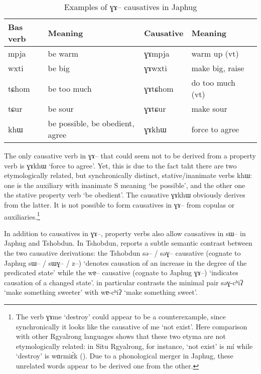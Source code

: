 \documentclass[oldfontcommands,oneside,a4paper,11pt]{article}
\newcommand{\ipa}[1]{{\phon \mbox{#1}}} %
\begin{document}
\begin{table}[h]
\caption{Examples of \ipa{ɣɤ--} causatives in Japhug} \label{tab:GA.caus} \centering
\begin{tabular}{lllll}
\toprule
Bas verb & Meaning & Causative & Meaning\\
\midrule
\ipa{mpja} & be warm & \ipa{ɣɤmpja} & warm up (vt)\\
\ipa{wxti} & be big & \ipa{ɣɤwxti} & make big, raise\\
\ipa{tɕhom} & be too much & \ipa{ɣɤtɕhom} & do too much (vt)\\
\ipa{tɕur} 	& be sour & \ipa{ɣɤtɕur} & make sour\\
\midrule
\ipa{khɯ} 	& be possible, be obedient, agree & \ipa{ɣɤkhɯ} & force to agree\\
\bottomrule
\end{tabular}
\end{table}
The only causative verb in \ipa{ɣɤ--} that could seem not to be derived from a property verb is \ipa{ɣɤkhɯ} `force to agree'. Yet, this is due to the fact taht there are two etymologically related, but synchronically distinct,  stative/inanimate verbs \ipa{khɯ}: one is the auxiliary with inanimate S meaning `be possible', and the other one the stative property verb `be obedient'. The causative \ipa{ɣɤkhɯ} obviously derives from the latter. It is not possible to form causatives in \ipa{ɣɤ--} from copulas or auxiliaries.\footnote{The verb \ipa{ɣɤme} `destroy' could appear to be a counterexample, since synchronically it looks like the causative of \ipa{me} `not exist'. Here comparison with other Rgyalrong languages shows that these two etyma are not etymologically related: in Situ Rgyalrong, for instance, `not exist' is \ipa{mí}  while `destroy' is \ipa{wɑrmiɛ́k}  (\citealt[334, 343]{huangsun02}). Due to a phonological merger in Japhug, these unrelated words appear to be derived one from the other. }

In addition to causatives in \ipa{ɣɤ--}, property verbs also allow causatives in \ipa{sɯ--} in Japhug and Tshobdun. In Tshobdun, \citet{jackson06paisheng, jackson13morpho} reports a subtle semantic contrast between the two causative derivations: the Tshobdun \ipa{sə--} / \ipa{səɣ--} causative (cognate to Japhug \ipa{sɯ--} / \ipa{sɯɣ--} / \ipa{z--}) `denotes causation of an increase in the degree
of the predicated state'  while the \ipa{wɐ--} causative (cognate to Japhug \ipa{ɣɤ--}) `indicates causation of a changed state'. \citet{jackson13morpho} in particular contrasts the minimal pair \ipa{səɣ-cʰiʔ} `make something sweeter' with \ipa{wɐ-cʰiʔ} `make something sweet'.
\end{document}
